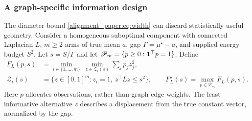 \subsubsection{A graph-specific information design}
The diameter bound \eqref{alignment_paper:eq:width} can discard statistically useful geometry. Consider a homogeneous suboptimal component with connected Laplacian $L$, $m\ge2$ arms of true mean $a$, gap $\Gamma=\mu^\star-a$, and supplied energy budget $S^2$. Let $s=S/\Gamma$ and let $\mathscr P_m=\{p\ge0:\mathbf1^\top p=1\}$. Define
\begin{align}
 F_L(p,s)&=\min_{i\in\{1,\ldots,m\}}\ \min_{z\in\mathcal Z_i(s)}
                 \sum_jp_jz_j^2,\label{alignment_paper:eq:designF}\\
 \mathcal Z_i(s)&=\{z\in[0,1]^m:z_i=1,\ z^\top Lz\le s^2\},\qquad
 F_L^\star(s)=\max_{p\in\mathscr P_m}F_L(p,s).\nonumber
\end{align}
Here $p$ allocates observations, rather than graph edge weights. The least informative alternative $z$ describes a displacement from the true constant vector, normalized by the gap.

